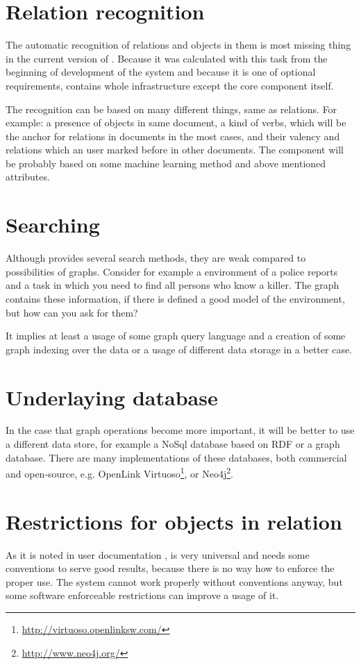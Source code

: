 
\section{Relation recognition}
The automatic recognition of relations and objects in them is most missing thing
in the current version of \textan{}. Because it was calculated with this task from
the beginning of development of the system and because it is one of optional
requirements, \textan{} contains whole infrastructure except the core component
itself.

The recognition can be based on many different things, same as relations.
For example: a presence of objects in same document, a kind of verbs, which will
be the anchor for relations in documents in the most cases, and their valency and
relations which an user marked before in other documents. The component will
be probably based on some machine learning method and above mentioned attributes.

\section{Searching}
Although \textan{} provides several search methods, they are weak compared to
possibilities of graphs. Consider for example a environment of a police reports
and a task in which you need to find all persons who know a killer. The graph
contains these information, if there is defined a good model of the environment,
but how can you ask for them?

It implies at least a usage of some graph query language and a creation of some
graph indexing over the data or a usage of different data storage in a better case. 

\section{Underlaying database}
In the case that graph operations become more important, it will be better to use
a different data store, for example a NoSql database based on RDF or a graph
database. There are many implementations of these databases, both commercial and
open-source, e.g. OpenLink Virtuoso\footnote{\url{http://virtuoso.openlinksw.com/}},
or Neo4j\footnote{\url{http://www.neo4j.org/}}.

\section{Restrictions for objects in relation}
As it is noted in user documentation ,
\textan{} is very universal and needs some conventions to serve good results,
because there is no way how to enforce the proper use. The system cannot work
properly without conventions anyway, but some software enforceable restrictions
can improve a usage of it.

